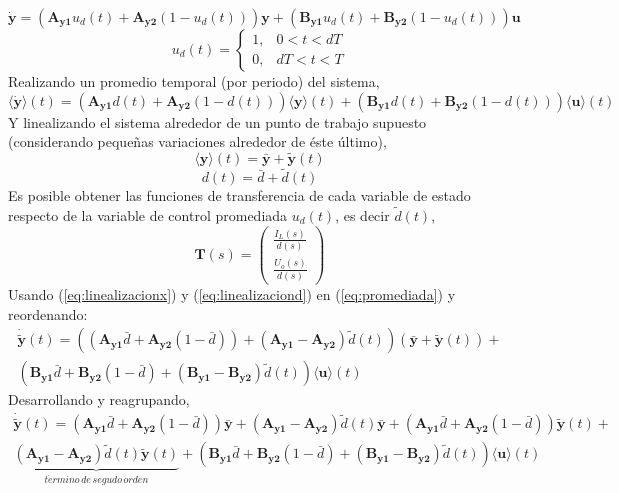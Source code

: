 \begin{equation}
\mathbf{\dot{y}}=(\mathbf{A_{y1}}u_{d}(t)+\mathbf{A_{y2}}(1-u_{d}(t)))\mathbf{y}+(\mathbf{B_{y1}}u_{d}(t)+\mathbf{B_{y2}}(1-u_{d}(t)))\mathbf{u}
\end{equation}
$$u_{d}(t)=\begin{cases}
1, & 0<t<dT\\
0, & dT<t<T
\end{cases}$$
Realizando un promedio temporal (por periodo) del sistema,
\begin{equation}
\langle\mathbf{\dot{y}}\rangle(t)=(\mathbf{A_{y1}}d(t)+\mathbf{A_{y2}}(1-d(t)))\langle\mathbf{y}\rangle(t)+(\mathbf{B_{y1}}d(t)+\mathbf{B_{y2}}(1-d(t)))\langle\mathbf{u}\rangle(t)
\label{eq:promediada}
\end{equation}
Y linealizando el sistema alrededor de un punto de trabajo supuesto (considerando pequeñas variaciones alrededor de éste último),
\begin{equation}
\langle\mathbf{y}\rangle(t)=\mathbf{\bar{y}}+\mathbf{\tilde{y}}(t)\label{eq:linealizacionx}
\end{equation}
\begin{equation}
d(t)=\bar{d}+\tilde{d}(t)\label{eq:linealizaciond}
\end{equation}
Es posible obtener las funciones de transferencia de cada variable de estado respecto de la variable de control promediada $u_{d}(t)$, es decir $\tilde{d}(t)$,
\begin{equation}
\mathbf{T}(s)=\left(\begin{array}{c}
\frac{I_{L}(s)}{d(s)}\\
\frac{U_{o}(s)}{d(s)}
\end{array}\right)
\end{equation}
Usando (\ref{eq:linealizacionx}) y (\ref{eq:linealizaciond}) en (\ref{eq:promediada}) y reordenando:
\begin{eqnarray}
\mathbf{\dot{\tilde{y}}}(t)=((\mathbf{A_{y1}}\bar{d}+\mathbf{A_{y2}}(1-\bar{d}))+ (\mathbf{A_{y1}}-\mathbf{A_{y2}})\tilde{d}(t))(\mathbf{\bar{y}}+\mathbf{\tilde{y}}(t))+ \nonumber \\ 
(\mathbf{B_{y1}}\bar{d}+\mathbf{B_{y2}}(1-\bar{d})+(\mathbf{B_{y1}}-\mathbf{B_{y2}})\tilde{d}(t))\langle\mathbf{u}\rangle(t) \nonumber
\end{eqnarray}
Desarrollando y reagrupando,
\begin{eqnarray}
  \mathbf{\dot{\tilde{y}}}(t)=(\mathbf{A_{y1}}\bar{d}+\mathbf{A_{y2}}(1-\bar{d}))\mathbf{\bar{y}}+
  (\mathbf{A_{y1}}-\mathbf{A_{y2}})\tilde{d}(t)\mathbf{\bar{y}}+(\mathbf{A_{y1}}\bar{d}+ \mathbf{A_{y2}}(1-\bar{d}))\mathbf{\tilde{y}}(t)+ \nonumber \\
  \underset{t\acute{e}rmino\, de\, segudo\, orden}{\underbrace{(\mathbf{A_{y1}}-\mathbf{A_{y2}})\tilde{d}(t)\mathbf{\tilde{y}}(t)}}+
  (\mathbf{B_{y1}}\bar{d}+\mathbf{B_{y2}}(1-\bar{d})+(\mathbf{B_{y1}}-\mathbf{B_{y2}})\tilde{d}(t))\langle\mathbf{u}\rangle(t) \nonumber
\end{eqnarray}
